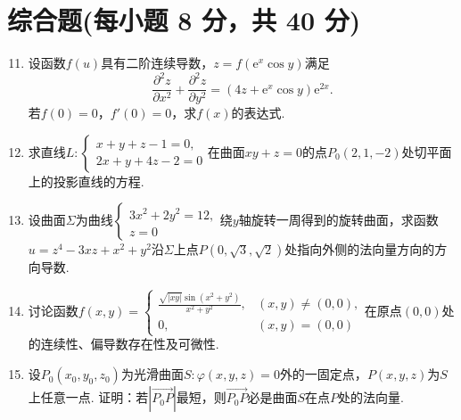 \documentclass[../Main.tex]{subfiles}
\begin{document}
\section{综合题(每小题 8 分，共 40 分)}
\begin{enumerate}
    \setcounter{enumi}{10}
    \item 设函数$f(u)$具有二阶连续导数，$z=f\left(\mathrm{e}^{x}\cos y\right
              )$满足
          \[
              \frac{\partial^{2} z}{\partial x^{2}}+\frac{\partial^{2} z}{\partial y^{2}}
              =\left(4z+\mathrm{e}^{x}\cos y\right)\mathrm{e}^{2x}.
          \]
          若$f(0)=0$，$f'(0)=0$，求$f(x)$的表达式.
          \vspace{10em}

    \item 求直线$L:
              \begin{cases}
                  x+y+z-1=0, \\
                  2x+y+4z-2=0
              \end{cases}$在曲面$xy+z=0$的点$P_{0}(2,1,-2)$处切平面上的投影直线的方程.
          \vspace{11em}

    \item 设曲面$\Sigma$为曲线$\begin{cases}
                  3x^{2}+2y^{2}=12, \\
                  z=0
              \end{cases}$绕$y$轴旋转一周得到的旋转曲面，求函数$u=z^{4}-3xz+x^{2}+y^{2}$沿$\Sigma$上点$P
              \left(0,\sqrt{3},\sqrt{2}\right)$处指向外侧的法向量方向的方向导数.
          \vspace{11em}

    \item 讨论函数$f(x,y)=
              \begin{cases}
                  \frac{\sqrt{|xy|}\sin(x^{2}+y^{2})}{x^{2}+y^{2}}, & (x,y)\neq (0,0), \\
                  0,                                                & (x,y)=(0,0)
              \end{cases}$在原点$(0,0)$处的连续性、偏导数存在性及可微性.
          \vspace{11em}

    \item 设$P_{0}(x_{0},y_{0},z_{0})$为光滑曲面$S:\varphi(x,y,z)=0$外的一固定点，$P
              (x,y,z)$为$S$上任意一点. 证明：若$\left|\overrightarrow{P_0P}\right|$最短，则$\overrightarrow
              {P_0P}$必是曲面$S$在点$P$处的法向量.
          \vspace{11em}
\end{enumerate}
\end{document}
